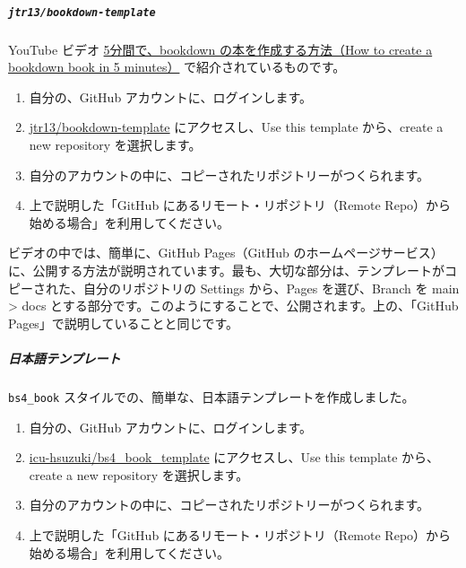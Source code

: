 \documentclass[
]{bxjsbook}
\providecommand{\tightlist}{%
  \setlength{\itemsep}{0pt}\setlength{\parskip}{0pt}}
\theoremstyle{definition}
\theoremstyle{definition}
\theoremstyle{definition}
\theoremstyle{definition}
\theoremstyle{remark}
\begin{document}
\hypertarget{jtr13bookdown-template}{%
\subparagraph{\texorpdfstring{\texttt{jtr13/bookdown-template}}{jtr13/bookdown-template}}\label{jtr13bookdown-template}}

YouTube ビデオ \href{https://www.youtube.com/watch?v=m5D-yoH416Y}{5分間で、bookdown の本を作成する方法（How to create a bookdown book in 5 minutes）} で紹介されているものです。

\begin{enumerate}
\def\labelenumi{\arabic{enumi}.}
\tightlist
\item
  自分の、GitHub アカウントに、ログインします。
\item
  \href{https://github.com/jtr13/bookdown-template}{jtr13/bookdown-template} にアクセスし、Use this template から、create a new repository を選択します。
\item
  自分のアカウントの中に、コピーされたリポジトリーがつくられます。
\item
  上で説明した「GitHub にあるリモート・リポジトリ（Remote Repo）から始める場合」を利用してください。
\end{enumerate}

ビデオの中では、簡単に、GitHub Pages（GitHub のホームページサービス）に、公開する方法が説明されています。最も、大切な部分は、テンプレートがコピーされた、自分のリポジトリの Settings から、Pages を選び、Branch を main \textgreater{} docs とする部分です。このようにすることで、公開されます。上の、「GitHub Pages」で説明していることと同じです。

\hypertarget{ux65e5ux672cux8a9eux30c6ux30f3ux30d7ux30ecux30fcux30c8}{%
\subparagraph{日本語テンプレート}\label{ux65e5ux672cux8a9eux30c6ux30f3ux30d7ux30ecux30fcux30c8}}

\texttt{bs4\_book} スタイルでの、簡単な、日本語テンプレートを作成しました。

\begin{enumerate}
\def\labelenumi{\arabic{enumi}.}
\tightlist
\item
  自分の、GitHub アカウントに、ログインします。
\item
  \href{https://github.com/icu-hsuzuki/bs4_book_template}{icu-hsuzuki/bs4\_book\_template} にアクセスし、Use this template から、create a new repository を選択します。
\item
  自分のアカウントの中に、コピーされたリポジトリーがつくられます。
\item
  上で説明した「GitHub にあるリモート・リポジトリ（Remote Repo）から始める場合」を利用してください。
\end{enumerate}
\end{document}
